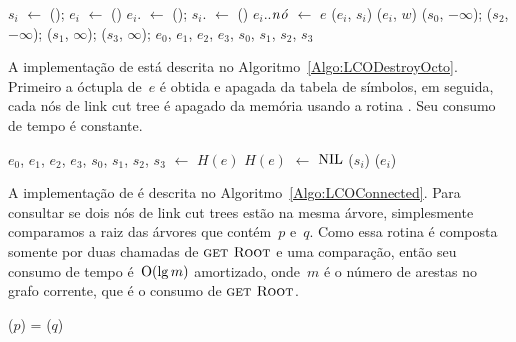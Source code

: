 \begin{algorithm}[htb]
\caption{\LCOMakeOcto($e$, $w$)}
\label{Algo:LCOMakeOcto}
\begin{algorithmic}[1]
  \State $s_i$ $\gets$ \linkcutCreate(); $e_i$ $\gets$ \linkcutCreate()
  \State $e_i$. $\gets$ \treapCreate(); $s_i$. $\gets$ \treapCreate()
  \State $e_i$..$\mathit{n\acute{o}}$ $\gets$ $e$
  \State \linkcutAddEdge($e_i$, $s_i$)
  \State \linkcutWeight($e_i$, $w$)
\EndFor
\State \linkcutWeight($s_0$, $-\infty$); \linkcutWeight($s_2$, $-\infty$);
\State \linkcutWeight($s_1$, $\infty$); \linkcutWeight($s_3$, $\infty$);
\State \Return $e_0$, $e_1$, $e_2$, $e_3$, $s_0$, $s_1$, $s_2$, $s_3$
\end{algorithmic}
\end{algorithm}

A implementação de \LCODestroyOcto{} está descrita no Algoritmo~\ref{Algo:LCODestroyOcto}.
Primeiro a óctupla de~$e$ é obtida e apagada da tabela de símbolos, em seguida, cada nós de link cut tree é apagado da memória usando a rotina \linkcutDestroy{}. Seu consumo de tempo é constante.
\begin{algorithm}[htb]
\caption{\LCODestroyOcto($H$, $e$)}
\label{Algo:LCODestroyOcto}
\begin{algorithmic}[1]
\State $e_0$, $e_1$, $e_2$, $e_3$, $s_0$, $s_1$, $s_2$, $s_3$ $\gets$ $H(e)$
\State $H(e)$ $\gets$ $\text{NIL}$
  \State \linkcutDestroy($s_i$)
  \State \linkcutDestroy($e_i$)
\EndFor
\end{algorithmic}
\end{algorithm}


A implementação de \LCOConnected{} é descrita no Algoritmo~\ref{Algo:LCOConnected}. Para consultar se dois nós de link cut trees estão na mesma árvore, simplesmente comparamos a raiz das árvores que contém~$p$ e~$q$.
Como essa rotina é composta somente por duas chamadas de $\text{\scshape \text{\scshape get Root}}$ e uma comparação, então seu consumo de tempo é~$\mathrm{O}(\lg m)$ amortizado, onde~$m$ é o número de arestas no grafo corrente, que é o consumo de $\text{\scshape \text{\scshape get Root}}$.

\begin{algorithm}[htb]
\caption{\LCOConnected($p$, $q$)}
\label{Algo:LCOConnected}
\begin{algorithmic}[1]
\State \Return \linkcutRoot($p$) = \linkcutRoot($q$)
\end{algorithmic}
\end{algorithm}

